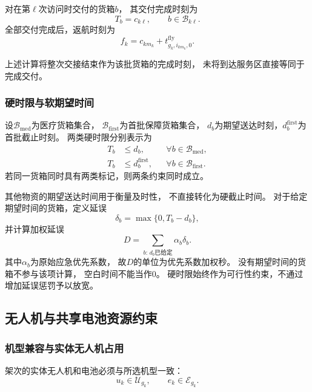 \documentclass[bwprint]{gmcmthesis}
\begin{document}
对在第$\ell$次访问时交付的货箱$b$，
其交付完成时刻为
\begin{equation}
    T_b=c_{k\ell},
    \qquad b\in\mathcal{B}_{k\ell}.
\end{equation}
全部交付完成后，返航时刻为
\begin{equation}
    f_k
    =
    c_{km_k}
    +
    t_{g_k,i_{km_k},0}^{\mathrm{fly}}.
\end{equation}

上述计算将整次交接结束作为该批货箱的完成时刻，
未将到达服务区直接等同于完成交付。

\subsubsection{硬时限与软期望时间}

设$\mathcal{B}_{\mathrm{med}}$为医疗货箱集合，
$\mathcal{B}_{\mathrm{first}}$为首批保障货箱集合，
$d_b$为期望送达时刻，$d_b^{\mathrm{first}}$为首批截止时刻。
两类硬时限分别表示为
\begin{align}
    T_b&\leq d_b,
    &&\forall b\in\mathcal{B}_{\mathrm{med}},\\
    T_b&\leq d_b^{\mathrm{first}},
    &&\forall b\in\mathcal{B}_{\mathrm{first}}.
\end{align}
若同一货箱同时具有两类标记，则两条约束同时成立。

其他物资的期望送达时间用于衡量及时性，
不直接转化为硬截止时间。
对于给定期望时间的货箱，定义延误
\begin{equation}
    \delta_b=\max\{0,T_b-d_b\},
\end{equation}
并计算加权延误
\begin{equation}
    D
    =
    \sum_{b:\,d_b\text{已给定}}
    \alpha_b\delta_b.
    \label{eq:q2_delay}
\end{equation}
其中$\alpha_b$为原始应急优先系数，
故$D$的单位为优先系数加权秒。
没有期望时间的货箱不参与该项计算，
空白时间不能当作0。
硬时限始终作为可行性约束，不通过增加延误惩罚予以放宽。

\subsection{无人机与共享电池资源约束}

\subsubsection{机型兼容与实体无人机占用}

架次的实体无人机和电池必须与所选机型一致：
\begin{equation}
    u_k\in\mathcal{U}_{g_k},
    \qquad
    e_k\in\mathcal{E}_{g_k}.
\end{equation}
\end{document}
